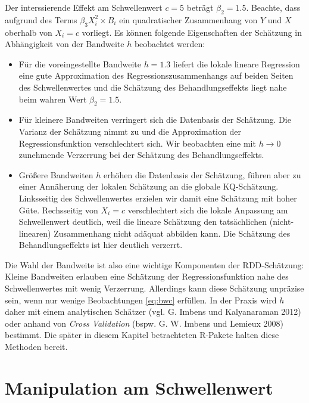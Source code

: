 \documentclass[
  a4paper,
  DIV=11,
  oneside]{scrreprt}
\begin{document}
Der interssierende Effekt am Schwellenwert \(c=5\) beträgt
\(\beta_2 = 1.5\). Beachte, dass aufgrund des Terms
\(\beta_3 X_i^2 \times B_i\) ein quadratischer Zusammenhang von \(Y\)
und \(X\) oberhalb von \(X_i = c\) vorliegt. Es können folgende
Eigenschaften der Schätzung in Abhängigkeit von der Bandweite \(h\)
beobachtet werden:

\begin{itemize}
\item
  Für die voreingestellte Bandweite \(h = 1.3\) liefert die lokale
  lineare Regression eine gute Approximation des
  Regressionszusammenhangs auf beiden Seiten des Schwellenwertes und die
  Schätzung des Behandlungseffekts liegt nahe beim wahren Wert
  \(\beta_2 = 1.5\).
\item
  Für kleinere Bandweiten verringert sich die Datenbasis der Schätzung.
  Die Varianz der Schätzung nimmt zu und die Approximation der
  Regressionsfunktion verschlechtert sich. Wir beobachten eine mit
  \(h\to0\) zunehmende Verzerrung bei der Schätzung des
  Behandlungseffekts.
\item
  Größere Bandweiten \(h\) erhöhen die Datenbasis der Schätzung, führen
  aber zu einer Annäherung der lokalen Schätzung an die globale
  KQ-Schätzung. Linksseitig des Schwellenwertes erzielen wir damit eine
  Schätzung mit hoher Güte. Rechsseitig von \(X_i = c\) verschlechtert
  sich die lokale Anpassung am Schwellenwert deutlich, weil die lineare
  Schätzung den tatsächlichen (nicht-linearen) Zusammenhang nicht
  adäquat abbilden kann. Die Schätzung des Behandlungseffekts ist hier
  deutlich verzerrt.
\end{itemize}

Die Wahl der Bandweite ist also eine wichtige Komponenten der
RDD-Schätzung: Kleine Bandweiten erlauben eine Schätzung der
Regressionsfunktion nahe des Schwellenwertes mit wenig Verzerrung.
Allerdings kann diese Schätzung unpräzise sein, wenn nur wenige
Beobachtungen \eqref{eq:bwc} erfüllen. In der Praxis wird \(h\) daher
mit einem analytischen Schätzer (vgl. G. Imbens und Kalyanaraman 2012)
oder anhand von \emph{Cross Validation} (bspw. G. W. Imbens und Lemieux
2008) bestimmt. Die später in diesem Kapitel betrachteten R-Pakete
halten diese Methoden bereit.

\section{Manipulation am
Schwellenwert}\label{manipulation-am-schwellenwert}
\end{document}
